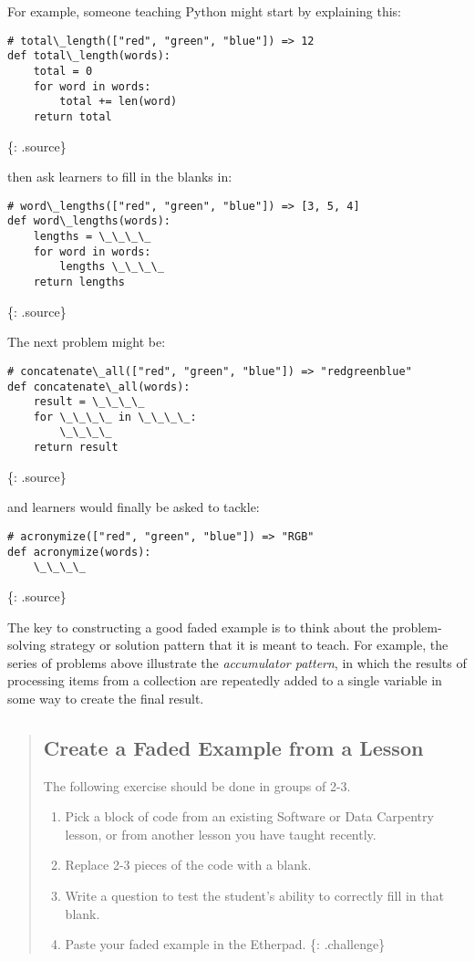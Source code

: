 For example, someone teaching Python might start by explaining this:

\begin{verbatim}
# total\_length(["red", "green", "blue"]) => 12
def total\_length(words):
    total = 0
    for word in words:
        total += len(word)
    return total
\end{verbatim}

\{: .source\}

then ask learners to fill in the blanks in:

\begin{verbatim}
# word\_lengths(["red", "green", "blue"]) => [3, 5, 4]
def word\_lengths(words):
    lengths = \_\_\_\_
    for word in words:
        lengths \_\_\_\_
    return lengths
\end{verbatim}

\{: .source\}

The next problem might be:

\begin{verbatim}
# concatenate\_all(["red", "green", "blue"]) => "redgreenblue"
def concatenate\_all(words):
    result = \_\_\_\_
    for \_\_\_\_ in \_\_\_\_:
        \_\_\_\_
    return result
\end{verbatim}

\{: .source\}

and learners would finally be asked to tackle:

\begin{verbatim}
# acronymize(["red", "green", "blue"]) => "RGB"
def acronymize(words):
    \_\_\_\_
\end{verbatim}

\{: .source\}

The key to constructing a good faded example is to think about the
problem-solving strategy or solution pattern that it is meant to teach.
For example, the series of problems above illustrate the
\emph{accumulator pattern}, in which the results of processing items
from a collection are repeatedly added to a single variable in some way
to create the final result.

\begin{quote}
\subsection{Create a Faded Example from a
Lesson}\label{create-a-faded-example-from-a-lesson}

The following exercise should be done in groups of 2-3.

\begin{enumerate}
\def\labelenumi{\arabic{enumi}.}
\itemsep1pt\parskip0pt
\item
  Pick a block of code from an existing Software or Data Carpentry
  lesson, or from another lesson you have taught recently.
\item
  Replace 2-3 pieces of the code with a blank.
\item
  Write a question to test the student's ability to correctly fill in
  that blank.
\item
  Paste your faded example in the Etherpad. \{: .challenge\}
\end{enumerate}
\end{quote}

